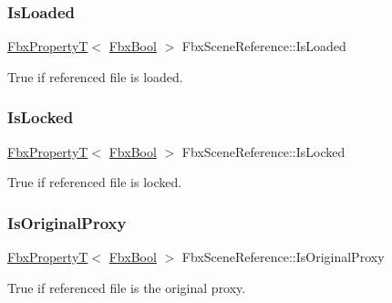 \subsubsection{\texorpdfstring{Is\+Loaded}{IsLoaded}}
{\footnotesize\ttfamily \hyperlink{class_fbx_property_t}{Fbx\+PropertyT}$<$ \hyperlink{fbxtypes_8h_a92e0562b2fe33e76a242f498b362262e}{Fbx\+Bool} $>$ Fbx\+Scene\+Reference\+::\+Is\+Loaded}



{\ttfamily True} if referenced file is loaded. 

\mbox{\label{class_fbx_scene_reference_a5b7de2086b4f2999c7473329e8887168}} 
\subsubsection{\texorpdfstring{Is\+Locked}{IsLocked}}
{\footnotesize\ttfamily \hyperlink{class_fbx_property_t}{Fbx\+PropertyT}$<$ \hyperlink{fbxtypes_8h_a92e0562b2fe33e76a242f498b362262e}{Fbx\+Bool} $>$ Fbx\+Scene\+Reference\+::\+Is\+Locked}



{\ttfamily True} if referenced file is locked. 

\mbox{\label{class_fbx_scene_reference_a5bf9c05304a408f9436a0677c3b4acef}} 
\subsubsection{\texorpdfstring{Is\+Original\+Proxy}{IsOriginalProxy}}
{\footnotesize\ttfamily \hyperlink{class_fbx_property_t}{Fbx\+PropertyT}$<$ \hyperlink{fbxtypes_8h_a92e0562b2fe33e76a242f498b362262e}{Fbx\+Bool} $>$ Fbx\+Scene\+Reference\+::\+Is\+Original\+Proxy}



{\ttfamily True} if referenced file is the original proxy. 

\mbox{\label{class_fbx_scene_reference_aac92c29ead8f25eea0dbaf0649b49c96}} 
